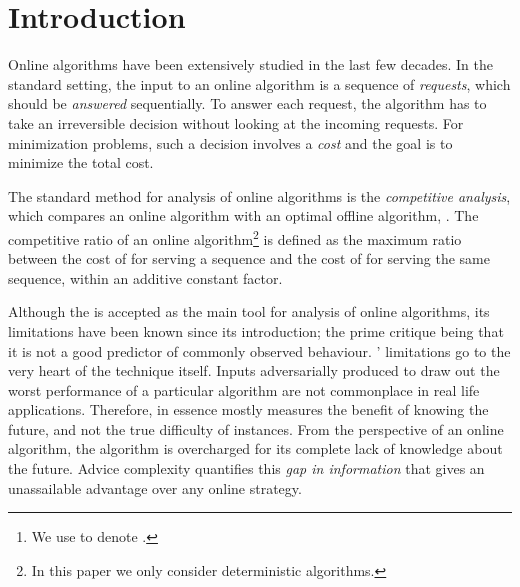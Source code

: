 
\begin{abstract}
We consider the {\ks}problem under the advice model of computation when the underlying metric space is sparse. On one side, we show that an advice of size  is required to obtain a -competitive algorithm for sequences of size , even for the 2-server problem on a path metric of size . Through another lower bound argument, we show that at least  bits of advice is required to obtain an optimal solution\footnote{We use  to denote .} for metric spaces of treewidth , where . On the other side, we introduce -competitive algorithms for a wide range of sparse graphs, which require advice of (almost) linear size. Namely, we show that for graphs of size  and treewidth , there is an online algorithm which receives  bits of advice and optimally serves a sequence of length . With a different argument, we show that if a graph admits a system of  collective tree -
spanners, then there is a -competitive algorithm which receives  bits of advice. Among other results, this gives a -competitive algorithm for planar graphs, provided with  bits of advice. 
\end{abstract}



\section{Introduction}\label{secIntro}
Online algorithms have been extensively studied in the last few decades. In the standard setting, the input to an online algorithm is a sequence of \textit{requests}, which should be \textit{answered} sequentially. To answer each request, the algorithm has to take an irreversible decision without looking at the incoming requests. For minimization problems, such a decision involves a \textit{cost} and the goal is to minimize the total cost. 

The standard method for analysis of online algorithms is the \textit{competitive analysis}, which compares an online algorithm with an optimal offline algorithm, \OPT. The competitive ratio of an online algorithm\footnote{In this paper we only consider deterministic algorithms.} \ALG is defined as the maximum ratio between the cost of \ALG for serving a sequence and the cost of \OPT for serving the same sequence, within an additive constant factor. 

Although the {\ca} is accepted as the main tool for analysis of online algorithms, its limitations have been known since its introduction; the prime critique being that it is not a good predictor of commonly observed behaviour.
{\Ca}' limitations go to the very heart of the technique itself. Inputs adversarially produced to draw out the worst performance of a particular algorithm are not commonplace in real life applications. Therefore, in essence {\ca} mostly measures the benefit of knowing the future, and not the true difficulty of instances. From the perspective of an online algorithm, the algorithm is overcharged for its complete lack of knowledge about the future.
Advice complexity quantifies this {\it gap in information} that gives \OPT an unassailable advantage over any online strategy. 

